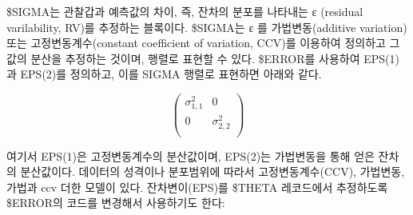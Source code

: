 \documentclass[
  10pt,
  krantz2,
  a4paper]{krantz}
\newenvironment{Shaded}{\begin{snugshade}}{\end{snugshade}}
\newcommand{\DecValTok}[1]{\textcolor[rgb]{0.00,0.00,0.81}{#1}}
\newcommand{\KeywordTok}[1]{\textcolor[rgb]{0.13,0.29,0.53}{\textbf{#1}}}
\newcommand{\NormalTok}[1]{#1}
\newcommand{\OperatorTok}[1]{\textcolor[rgb]{0.81,0.36,0.00}{\textbf{#1}}}
\newcommand{\StringTok}[1]{\textcolor[rgb]{0.31,0.60,0.02}{#1}}
\newenvironment{Shaded}{\begin{snugshade}}{\end{snugshade}}
\theoremstyle{definition}
\theoremstyle{definition}
\theoremstyle{definition}
\theoremstyle{remark}
\begin{document}
\$SIGMA는 관찰갑과 예측값의 차이, 즉, 잔차의 분포를 나타내는 ε (residual varilability, RV)를 추정하는 블록이다. \$SIGMA는 ε 를 가법변동(additive variation) 또는 고정변동계수(constant coefficient of variation, CCV)를 이용하여 정의하고 그 값의 분산을 추정하는 것이며, 행렬로 표현할 수 있다. \$ERROR를 사용하여 EPS(1)과 EPS(2)를 정의하고, 이를 SIGMA 행렬로 표현하면 아래와 같다.

\begin{Shaded}
\end{Shaded}

\begin{equation}
\begin{pmatrix} 
   \sigma_{1,1}^2 & 0 \\
   0 & \sigma_{2,2}^2 \\
\end{pmatrix}
\label{eq:ccv-equation}
\end{equation}

여기서 EPS(1)은 고정변동계수의 분산값이며, EPS(2)는 가법변동을 통해 얻은 잔차의 분산값이다. 데이터의 성격이나 분포범위에 따라서 고정변동계수(CCV), 가법변동, 가법과 ccv 더한 모델이 있다. 잔차변이(EPS)를 \$THETA 레코드에서 추정하도록 \$ERROR의 코드를 변경해서 사용하기도 한다:
\end{document}
